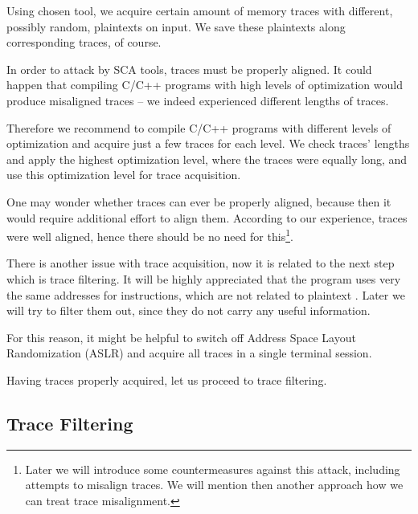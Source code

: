 Using chosen tool, we acquire certain amount of memory traces with different, possibly random, plaintexts on input. We save these plaintexts along corresponding traces, of course.

\begin{note}
\label{note:optim}
	In order to attack by SCA tools, traces must be properly aligned. It could happen that compiling C/C++ programs with high levels of optimization would produce misaligned traces -- we indeed experienced different lengths of traces.
	
	Therefore we recommend to compile C/C++ programs with different levels of optimization and acquire just a few traces for each level. We check traces' lengths and apply the highest optimization level, where the traces were equally long, and use this optimization level for trace acquisition.
\end{note}

One may wonder whether traces can ever be properly aligned, because then it would require additional effort to align them. According to our experience, traces were well aligned, hence there should be no need for this\footnote{Later we will introduce some countermeasures against this attack, including attempts to misalign traces. We will mention then another approach how we can treat trace misalignment.}.

\begin{note}
\label{note:aslr}
	There is another issue with trace acquisition, now it is related to the next step which is trace filtering. It will be highly appreciated that the program uses very the same addresses for instructions, which are not related to plaintext . Later we will try to filter them out, since they do not carry any useful information.
	
	For this reason, it might be helpful to switch off Address Space Layout Randomization (ASLR) and acquire all traces in a single terminal session.
\end{note}

Having traces properly acquired, let us proceed to trace filtering.



\subsection{Trace Filtering}
\label{sec:filter}

